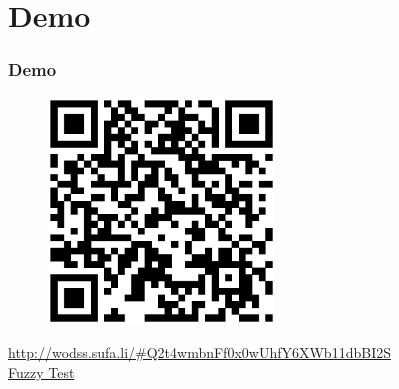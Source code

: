\section{Demo}
\begin{frame}
    \frametitle{Demo}
    \begin{center}
        \begin{figure}
            \includegraphics[height=6cm]{media/qr-wodss-sufa-li.eps}
        \end{figure}
        \url{http://wodss.sufa.li/\#Q2t4wmbnFf0x0wUhfY6XWb11dbBI2S}\\
        \href{http://wodss.sufa.li/fuzzy.html\#Q2t4wmbnFf0x0wUhfY6XWb11dbBI2S}{Fuzzy Test}
    \end{center}
\end{frame}